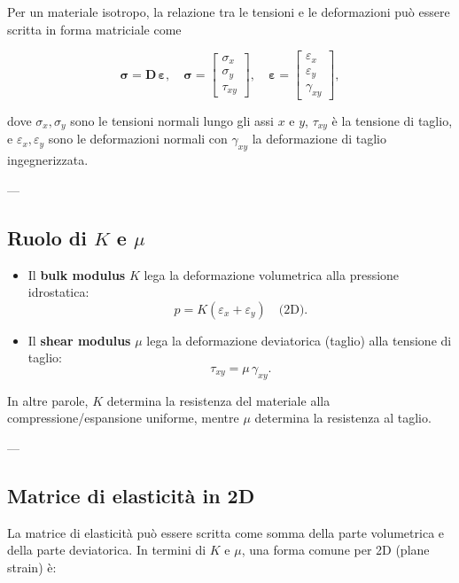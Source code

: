 \documentclass{article}
\begin{document}
Per un materiale isotropo, la relazione tra le tensioni e le deformazioni può essere scritta in forma matriciale come

\[
\boldsymbol{\sigma} = \mathbf{D} \, \boldsymbol{\varepsilon}, 
\quad 
\boldsymbol{\sigma} = 
\begin{bmatrix} \sigma_x \\ \sigma_y \\ \tau_{xy} \end{bmatrix},
\quad
\boldsymbol{\varepsilon} =
\begin{bmatrix} \varepsilon_x \\ \varepsilon_y \\ \gamma_{xy} \end{bmatrix},
\]

dove $\sigma_x, \sigma_y$ sono le tensioni normali lungo gli assi $x$ e $y$, $\tau_{xy}$ è la tensione di taglio, e $\varepsilon_x, \varepsilon_y$ sono le deformazioni normali con $\gamma_{xy}$ la deformazione di taglio ingegnerizzata.

---

\subsection*{Ruolo di $K$ e $\mu$}

\begin{itemize}
    \item Il \textbf{bulk modulus} $K$ lega la deformazione volumetrica alla pressione idrostatica:
    \[
    p = K (\varepsilon_x + \varepsilon_y) \quad \text{(2D)}.
    \]
    \item Il \textbf{shear modulus} $\mu$ lega la deformazione deviatorica (taglio) alla tensione di taglio:
    \[
    \tau_{xy} = \mu \, \gamma_{xy}.
    \]
\end{itemize}

In altre parole, $K$ determina la resistenza del materiale alla compressione/espansione uniforme, mentre $\mu$ determina la resistenza al taglio.

---

\subsection*{Matrice di elasticità in 2D}

La matrice di elasticità può essere scritta come somma della parte volumetrica e della parte deviatorica. In termini di $K$ e $\mu$, una forma comune per 2D (plane strain) è:
\end{document}
